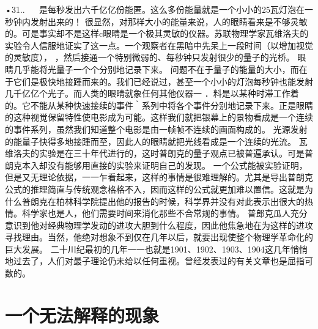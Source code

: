 •31..
  
是每秒发出六千亿亿份能匿。这么多份能量就是一个小小的25瓦灯泡在一秒钟内发射出来的！
很显然，对那样大小的能量来说，人的眼睛看来是不够灵敏的。可是事实却不是这样c眼睛是一个极其灵敏的仪器。苏联物理学家瓦维洛夫的实验令人信服地证实了这一点。一个观察者在黑暗中先呆上一段时间（以增加视觉的灵敏度），
，然后接通一个特别微弱的、每秒钟只发射很少的量子的光桥。
眼睛几乎能将光量子一个个分别地记录下来。
问题不在于量子的能量的大小，而在于它们是极快地接踵而来的。我们已经说过，甚至一个小小的灯泡每秒钟也能发射几千亿亿个光子。而人类的眼睛就象任何其他仪器一
．料是以某种时滞工作着的。它不能从某种快速接续的事件｀系列中将各个事件分别地记录下来。正是眼睛的这种视觉保留特性使电影成为可能。这样我们就把银幕上的景物看成是一个连续的事件系列，虽然我们知道整个电影是由一帧帧不连续的画面构成的。
光源发射的能量子快得多地接踵而至，因此人的眼睛就把光线看成是一个连续的光流。
瓦维洛夫的实验是在三十年代进行的，这时普朗克的量子观点已被普遍承认。可是普朗克本入却没有能够用直接的实验来证明自己的发现。
一个公式能被实验证明，但是又无理论依据，一一乍看起来，这样的事情是很难理解的。尤其是导出普朗克公式的推理简直与传统观念格格不入，因而这样的公式就更加难以置信。这就是为什么普朗克在柏林科学院提出他的报告的时候，科学界并没有对此表示出很大的热情。科学家也是人，他们需要时间来消化那些不合常规的事情。
普郎克瓜人充分意识到他对经典物理学发动的进攻大胆到什么程度，因此他焦急地在为这样的进攻寻找理由。当然，他绝对想象不到仅在几年以后，就要出现使整个物理学革命化的巨大发展。
二十川纪最初的几年一一也就是1901、1902、1903、1904这几年悄悄地过去了，人们对最子理论仍未给以任何重视。曾经发表过的有关文章也是屈指可数的。

\section{一个无法解释的现象}

